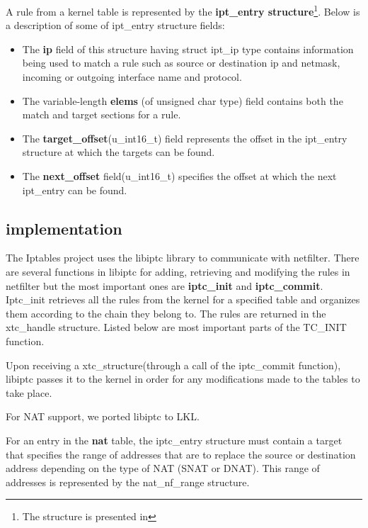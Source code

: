 {{A rule from a kernel table is represented by the \textbf{ipt_entry structure}\footnote{The structure is presented in }. 
Below is a description of some of ipt_entry structure fields:
\begin{itemize}
\item The \textbf{ip} field of this structure having struct ipt_ip type contains information being used to match a rule such as source or destination ip and netmask, incoming or outgoing interface name and protocol. \item The variable-length \textbf{elems} (of unsigned char type) field contains both the match and target sections for a rule. 
\item The \textbf{target_offset}(u_int16_t) field represents the offset in the ipt_entry structure at which the targets can be found. 
\item The \textbf{next_offset} field(u_int16_t) specifies the offset at which the next ipt_entry can be found.   
\end{itemize}

\subsection{\project implementation}
\label{sub-sec:nat-lklnet}
The Iptables project uses the libiptc library to communicate with netfilter. There are several functions in libiptc for adding, retrieving and modifying the rules in netfilter but the most important ones are \textbf{iptc_init} and \textbf{iptc_commit}. 
Iptc_init retrieves all the rules from the kernel for a specified table and organizes them according to the chain they belong to. The rules are returned in the xtc_handle structure. Listed below are most important parts of the TC_INIT function.

\lstset{language=C, caption=TC_INIT}


Upon receiving a xtc_structure(through a call of the iptc_commit function), libiptc passes it to the kernel in order for any modifications made to the tables to take place.

For NAT support, we ported libiptc to LKL.

For an entry in the \textbf{nat} table, the iptc_entry structure must contain a target that specifies the range 
of addresses that are to replace the source or destination address depending on the type of NAT (SNAT or DNAT). 
This range of addresses is represented by the nat_nf_range structure.

}}
